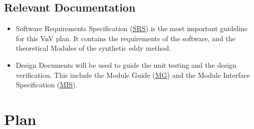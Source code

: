 \documentclass[12pt, titlepage]{article}
\begin{document}


\subsection{Relevant Documentation}

\begin{itemize}
  \item Software Requirements Specification (\href{https://github.com/omltcat/turbulent-flow/blob/main/docs/SRS/SRS.pdf}{SRS}) is the most important guideline for this VnV plan. It contains the requirements of the software, and the theoretical Modules of the synthetic eddy method. 
  \item Design Documents will be used to guide the unit testing and the design verification. This include the Module Guide (\href{https://github.com/omltcat/turbulent-flow/blob/main/docs/Design/SoftArchitecture/MG.pdf}{MG}) and the Module Interface Specification (\href{https://github.com/omltcat/turbulent-flow/blob/main/docs/Design/SoftDetailedDes/MIS.pdf}{MIS}). 
\end{itemize}



\section{Plan}
\end{document}
